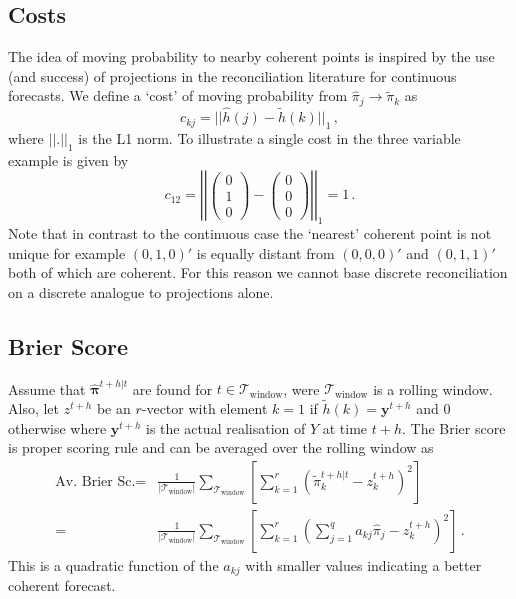 \documentclass[a4paper,review,12pt,authoryear]{elsarticle}
\newcommand{\bpi}{\bm{\pi}}
\begin{document}
    \subsection{Costs}
    
    The idea of moving probability to nearby coherent points is inspired by the use (and success) of projections in the reconciliation literature for continuous forecasts. We define a `cost' of moving probability from $\hat{\pi}_j\rightarrow\tilde{\pi}_k$ as
    \[
    c_{kj}=||\hat{h}(j)-\tilde{h}(k)||_1\,,
    \]
    where $||.||_1$ is the L1 norm. To illustrate a single cost in the three variable example is given by
    \[
    c_{12}=\left|\left|\begin{pmatrix}0\\1\\0\end{pmatrix}-\begin{pmatrix}0\\0\\0\end{pmatrix}\right|\right|_1=1\,.
    \]
    Note that in contrast to the continuous case the `nearest' coherent point is not unique for example $(0,1,0)'$ is equally distant from $(0,0,0)'$ and $(0,1,1)'$ both of which are coherent. For this reason we cannot base discrete reconciliation on a discrete analogue to projections alone.
    
    \subsection{Brier Score}
    
    Assume that $\hat{\bpi}^{t+h|t}$ are found for $t\in\mathcal{T}_{\textrm{window}}$, were $\mathcal{T}_{\textrm{window}}$ is a rolling window. Also, let $z^{t+h}$ be an $r$-vector with element $k=1$ if $\tilde{h}(k)=\bm{y}^{t+h}$ and $0$ otherwise where $\bm{y}^{t+h}$ is the actual realisation of $Y$ at time $t+h$. The Brier score is  proper scoring rule and can be averaged over the rolling window as
    \begin{align*}
    \textrm{Av. Brier Sc.}=&\frac{1}{|\mathcal{T}_{\textrm{window}}|}\sum\limits_{\mathcal{T}_{\textrm{window}}}\left[\sum\limits_{k=1}^r\left(\tilde{\pi}_k^{t+h|t}-z^{t+h}_k\right)^2\right]\\
    =&\frac{1}{|\mathcal{T}_{\textrm{window}}|}\sum\limits_{\mathcal{T}_{\textrm{window}}}\left[\sum\limits_{k=1}^r\left(\sum\limits_{j=1}^q a_{kj}\hat{{\pi}}_j-z^{t+h}_k\right)^2\right]\,.
    \end{align*}
    This is a quadratic function of the $a_{kj}$ with smaller values indicating a better coherent forecast.
    
\end{document}
